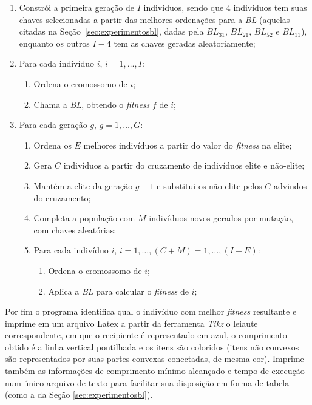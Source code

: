 \begin{enumerate}
    \item Constrói a primeira geração de $I$ indivíduos, sendo que $4$ indivíduos tem suas chaves selecionadas a partir das melhores ordenações para a \textit{BL} (aquelas citadas na Seção~\ref{sec:experimentosbl}, dadas pela $BL_{31}$, $BL_{21}$, $BL_{52}$ e $BL_{11}$), enquanto os outros $I-4$ tem as chaves geradas aleatoriamente;
    \item Para cada indivíduo $i$, $i = 1, \dots, I$:
    \begin{enumerate}
        \item Ordena o cromossomo de $i$;
        \item Chama a \textit{BL}, obtendo o \textit{fitness} $f$ de $i$;
    \end{enumerate}
    \item Para cada geração $g$, $g = 1, \dots, G$:
    \begin{enumerate}
        \item Ordena os $E$ melhores indivíduos a partir do valor do \textit{fitness} na elite;
        \item Gera $C$ indivíduos a partir do cruzamento de indivíduos elite e não-elite;
        \item Mantém a elite da geração $g-1$ e substitui os não-elite pelos $C$ advindos do cruzamento;
        \item Completa a população com $M$ indivíduos novos gerados por mutação, com chaves aleatórias;
        \item Para cada indivíduo $i$, $i = 1, \dots, (C+M) = 1, \dots, (I-E)$:
        \begin{enumerate}
            \item Ordena o cromossomo de $i$;
            \item Aplica a \textit{BL} para calcular o \textit{fitness} de $i$;
        \end{enumerate}
    \end{enumerate}
\end{enumerate}

Por fim o programa identifica qual o indivíduo com melhor \textit{fitness} resultante e imprime em um arquivo Latex a partir da ferramenta \textit{Tikz} o leiaute correspondente, em que o recipiente é representado em azul, o comprimento obtido é a linha vertical pontilhada e os itens são coloridos (itens não convexos são representados por suas partes convexas conectadas, de mesma cor). 
Imprime também as informações de comprimento mínimo alcançado e tempo de execução num único arquivo de texto para facilitar sua disposição em forma de tabela (como a da Seção \ref{sec:experimentosbl}).


